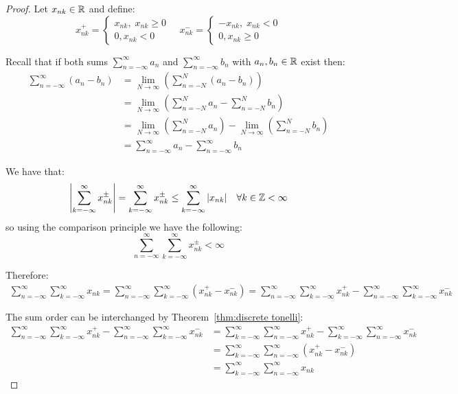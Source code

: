 \begin{proof}
    Let $x_{nk} \in \mathbb{R}$ and define:
    \[
        x_{nk}^+ = \begin{cases}
            x_{nk}, \; x_{nk} \geq 0 \\
            0, x_{nk} < 0
        \end{cases} \quad
        x_{nk}^- = \begin{cases}
            -x_{nk}, \; x_{nk} < 0 \\
            0, x_{nk} \geq 0
        \end{cases} \]

    Recall that if both sums $\sum_{n=-\infty}^{\infty} a_n$ and $\sum_{n=-\infty}^{\infty} b_n$ with $a_n, b_n \in \mathbb{R}$ exist then:
    \begin{align*}
        \sum_{n=-\infty}^{\infty} (a_n - b_n)
         & = \lim_{N\to \infty} \left(\sum_{n=-N}^{N} (a_n - b_n)\right)
        \\ &= \lim_{N\to \infty} \left(\sum_{n=-N}^{N} a_n - \sum_{n=-N}^{N} b_n\right)
        \\ &= \lim_{N\to \infty} \left(\sum_{n=-N}^{N} a_n\right) - \lim_{N\to \infty}  \left(\sum_{n=-N}^{N} b_n\right)
        \\ &= \sum_{n=-\infty}^{\infty} a_n - \sum_{n=-\infty}^{\infty} b_n
    \end{align*}

    We have that:
    \[
        \left|\sum_{k = -\infty}^{\infty} x^{\pm}_{nk} \right|
        = \sum_{k = -\infty}^{\infty} x^{\pm}_{nk}
        \leq \sum_{k=-\infty}^{\infty} |x_{nk}| \quad \forall k \in \mathbb{Z} < \infty\]
    so using the comparison principle we have the following:
    \[
        \sum_{n = -\infty}^{\infty} \sum_{k = -\infty}^{\infty} x^{\pm}_{nk} < \infty\]

    Therefore:
    \begin{align*}
        \sum_{n=-\infty}^{\infty} \sum_{k=-\infty}^{\infty} x_{nk}
        = \sum_{n=-\infty}^{\infty} \sum_{k=-\infty}^{\infty} (x^+_{nk} - x^-_{nk})
        = \sum_{n=-\infty}^{\infty} \sum_{k=-\infty}^{\infty} x^+_{nk} - \sum_{n=-\infty}^{\infty} \sum_{k=-\infty}^{\infty} x^-_{nk}
    \end{align*}

    The sum order can be interchanged by Theorem~\ref{thm:discrete tonelli}:
    \begin{align*}
        \sum_{n=-\infty}^{\infty} \sum_{k=-\infty}^{\infty} x^+_{nk} - \sum_{n=-\infty}^{\infty} \sum_{k=-\infty}^{\infty} x^-_{nk}
         & = \sum_{k=-\infty}^{\infty} \sum_{n=-\infty}^{\infty} x^+_{nk} - \sum_{k=-\infty}^{\infty} \sum_{n=-\infty}^{\infty} x^-_{nk}
        \\ &= \sum_{k=-\infty}^{\infty} \sum_{n=-\infty}^{\infty} (x^+_{nk} - x^-_{nk})
        \\ &= \sum_{k=-\infty}^{\infty} \sum_{n=-\infty}^{\infty} x_{nk}
    \end{align*}


\end{proof}

